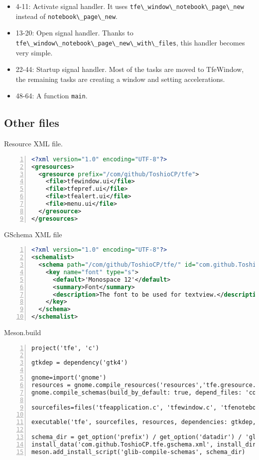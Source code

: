 \begin{itemize}
\tightlist
\item
  4-11: Activate signal handler. It uses
  \passthrough{\lstinline!tfe\_window\_notebook\_page\_new!} instead of
  \passthrough{\lstinline!notebook\_page\_new!}.
\item
  13-20: Open signal handler. Thanks to
  \passthrough{\lstinline!tfe\_window\_notebook\_page\_new\_with\_files!},
  this handler becomes very simple.
\item
  22-44: Startup signal handler. Most of the tasks are moved to
  TfeWindow, the remaining tasks are creating a window and setting
  accelerations.
\item
  48-64: A function \passthrough{\lstinline!main!}.
\end{itemize}

\hypertarget{other-files}{%
\subsection{Other files}\label{other-files}}

Resource XML file.

\begin{lstlisting}[language=XML, numbers=left]
<?xml version="1.0" encoding="UTF-8"?>
<gresources>
  <gresource prefix="/com/github/ToshioCP/tfe">
    <file>tfewindow.ui</file>
    <file>tfepref.ui</file>
    <file>tfealert.ui</file>
    <file>menu.ui</file>
  </gresource>
</gresources>
\end{lstlisting}

GSchema XML file

\begin{lstlisting}[language=XML, numbers=left]
<?xml version="1.0" encoding="UTF-8"?>
<schemalist>
  <schema path="/com/github/ToshioCP/tfe/" id="com.github.ToshioCP.tfe">
    <key name="font" type="s">
      <default>'Monospace 12'</default>
      <summary>Font</summary>
      <description>The font to be used for textview.</description>
    </key>
  </schema>
</schemalist>
\end{lstlisting}

Meson.build

\begin{lstlisting}[numbers=left]
project('tfe', 'c')

gtkdep = dependency('gtk4')

gnome=import('gnome')
resources = gnome.compile_resources('resources','tfe.gresource.xml')
gnome.compile_schemas(build_by_default: true, depend_files: 'com.github.ToshioCP.tfe.gschema.xml')

sourcefiles=files('tfeapplication.c', 'tfewindow.c', 'tfenotebook.c', 'tfepref.c', 'tfealert.c', 'css.c', '../tfetextview/tfetextview.c')

executable('tfe', sourcefiles, resources, dependencies: gtkdep, export_dynamic: true, install: true)

schema_dir = get_option('prefix') / get_option('datadir') / 'glib-2.0/schemas/'
install_data('com.github.ToshioCP.tfe.gschema.xml', install_dir: schema_dir)
meson.add_install_script('glib-compile-schemas', schema_dir)
\end{lstlisting}

